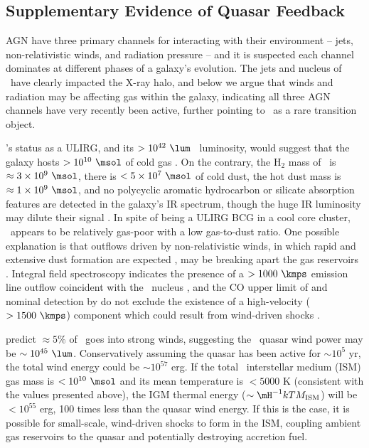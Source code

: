 \documentclass[useAMS,usenatbib]{mn2e}
\begin{document}
\subsection{Supplementary Evidence of Quasar Feedback}

AGN have three primary channels for interacting with their environment
-- jets, non-relativistic winds, and radiation pressure -- and it is
suspected each channel dominates at different phases of a galaxy's
evolution. The jets and nucleus of \irs\ have clearly impacted the
X-ray halo, and below we argue that winds and radiation may be
affecting gas within the galaxy, indicating all three AGN channels
have very recently been active, further pointing to \irs\ as a rare
transition object.

\irs's status as a ULIRG, and its $> 10^{42} ~\lum$
\halpha\ luminosity, would suggest that the galaxy hosts $> 10^{10}
~\msol$ of cold gas \citep[\eg][]{1988ApJ...325...74S, edge01}. On the
contrary, the H$_2$ mass of \irs\ is $\approx 3 \times 10^{9} ~\msol$,
there is $< 5 \times 10^7 ~\msol$ of cold dust, the hot dust mass is
$\approx 1 \times 10^9 ~\msol$, and no polycyclic aromatic hydrocarbon
or silicate absorption features are detected in the galaxy's IR
spectrum, though the huge IR luminosity may dilute their signal
\citep{1997A&A...318L...1T, 2004ApJ...613..986P, 2008ApJ...683..114S,
  2010arXiv1009.2040C}. In spite of being a ULIRG BCG in a cool core
cluster, \irs\ appears to be relatively gas-poor with a low
gas-to-dust ratio. One possible explanation is that outflows driven by
non-relativistic winds, in which rapid and extensive dust formation
are expected \citep{2002ApJ...567L.107E}, may be breaking apart the
gas reservoirs \citep[\eg][]{2010MNRAS.401....7H}. Integral field
spectroscopy indicates the presence of a $> 1000 ~\kmps$ emission line
outflow coincident with the \irs\ nucleus \citep{1996MNRAS.283.1003C},
and the CO upper limit of \citet{1998ApJ...506..205E} and nominal
detection by \citet{2010arXiv1009.2040C} do not exclude the existence
of a high-velocity ($> 1500 ~\kmps$) component which could result from
wind-driven shocks \citep[\eg][]{2010A&A...518L.155F}.  

\citet{2005ApJ...619...60L} predict $\approx 5\%$ of \lqso\ goes into
strong winds, suggesting the \irs\ quasar wind power may be $\sim
10^{45} ~\lum$. Conservatively assuming the quasar has been active for
$\sim 10^5$ yr, the total wind energy could be $\sim 10^{57}$ erg. If
the total \irs\ interstellar medium (ISM) gas mass is $< 10^{10}
~\msol$ and its mean temperature is $< 5000$ K (consistent with the
values presented above), the IGM thermal energy ($\sim \mH^{-1} kT
M_{\rm{ISM}}$) will be $< 10^{55}$ erg, 100 times less than the quasar
wind energy. If this is the case, it is possible for small-scale,
wind-driven shocks to form in the ISM, coupling ambient gas reservoirs
to the quasar and potentially destroying accretion fuel.
\end{document}
